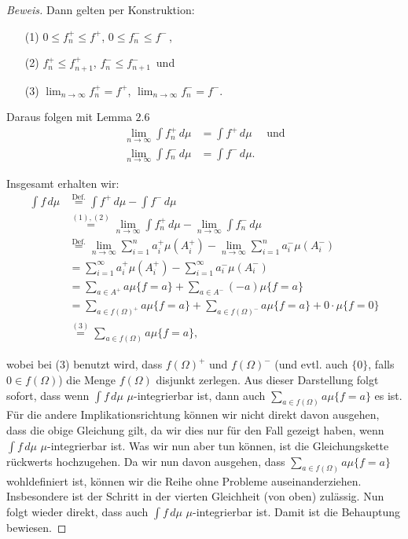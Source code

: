 \documentclass[10pt]{article}
\begin{document}
\begin{theorem}
\begin{proof}[Beweis]
		Dann gelten per Konstruktion:
		\begin{itemize}
			\item[(1)] $0\leq f_n^+ \leq f^{+}$, $0\leq f_n^- \leq f^{-}$\,,
			\item[(2)] $f_n^+ \leq f_{n+1}^+$, $f_n^- \leq f_{n+1}^-$\, und
			\item[(3)] $\lim_{n\to\infty} f_n^{+} = f^{+}$, $\lim_{n\to\infty} f_n^{-} = f^{-}$.
		\end{itemize}

		Daraus folgen mit Lemma $2.6$ 
		\begin{align}
			\lim_{n\to\infty} \int f_n^{+} \,d\mu &= \int f^{+} \,d\mu \quad \text{ und} \\
			\lim_{n\to\infty} \int f_n^{-} \,d\mu &= \int f^{-} \,d\mu. 
		\end{align}

		Insgesamt erhalten wir:
		\begin{align*}
			\int f\,d\mu &\overset{\text{Def.}}{=} \int f^+\,d\mu - \int f^-\,d\mu \\
						 &\overset{(1),(2)}{=} \lim_{n\to\infty} \int f_n^{+} \,d\mu - \lim_{n\to\infty} \int f_n^{-} \,d\mu \\
						 &\overset{\text{Def.}}{=}  \lim_{n\to\infty}\sum_{i=1}^{n} a_i^{+}\mu(A_i^+) - \lim_{n\to\infty}\sum_{i=1}^{n} a_i^{-}\mu(A_i^-) \\
						 &= \sum_{i=1}^{\infty} a_i^{+}\mu(A_i^+) - \sum_{i=1}^{\infty} a_i^{-}\mu(A_i^-) \\
						 &= \sum_{a\in A^+} a\mu\{f = a\} + \sum_{a\in A^-} (-a)\mu\{f = a\} \\
						 &= \sum_{a\in f(\Omega)^+} a\mu\{f = a\} + \sum_{a\in f(\Omega)^-} a\mu\{f = a\} + 0\cdot \mu\{f = 0\}\\
						 &\overset{(3)}{=} \sum_{a\in f(\Omega)} a \mu\{f = a\},
		\end{align*}

		wobei bei (3) benutzt wird, dass $f(\Omega)^+$ und $f(\Omega)^-$
		(und evtl. auch $\{0\}$, falls $0\in f(\Omega)$) die Menge $f(\Omega)$ disjunkt zerlegen.  
		Aus dieser Darstellung folgt sofort, dass wenn $\int f\,d\mu$ $\mu$-integrierbar ist, dann auch
		$\sum_{a\in f(\Omega)} a \mu\{f = a\}$ es ist. Für die andere Implikationsrichtung können wir 
		nicht direkt davon ausgehen, dass die obige Gleichung gilt, da wir dies nur für den Fall gezeigt haben, 
		wenn $\int f\,d\mu$ $\mu$-integrierbar ist. Was wir nun aber tun können, ist die Gleichungskette rückwerts 
		hochzugehen. Da wir nun davon ausgehen, dass $\sum_{a\in f(\Omega)} a \mu\{f = a\}$ wohldefiniert ist, 
		können wir die Reihe ohne Probleme auseinanderziehen. Insbesondere ist der Schritt in der vierten Gleichheit 
		(von oben) zulässig.
		Nun folgt wieder direkt, dass auch $\int f\,d\mu$ $\mu$-integrierbar ist. 
		Damit ist die Behauptung bewiesen.
	\end{proof}
\end{theorem}
\end{document}
